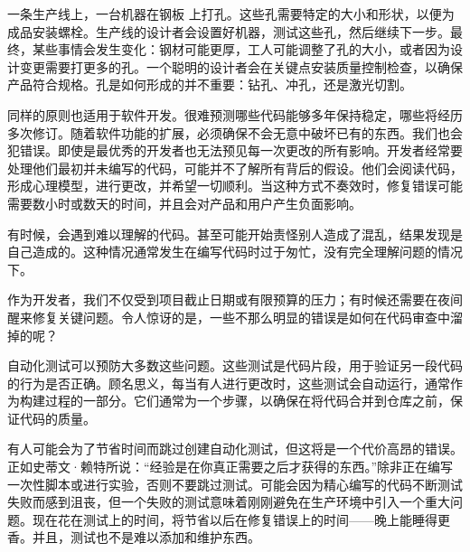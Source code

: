 一条生产线上，一台机器在钢板 上打孔。这些孔需要特定的大小和形状，以便为成品安装螺栓。生产线的设计者会设置好机器，测试这些孔，然后继续下一步。最终，某些事情会发生变化：钢材可能更厚，工人可能调整了孔的大小，或者因为设计变更需要打更多的孔。一个聪明的设计者会在关键点安装质量控制检查，以确保产品符合规格。孔是如何形成的并不重要：钻孔、冲孔，还是激光切割。

同样的原则也适用于软件开发。很难预测哪些代码能够多年保持稳定，哪些将经历多次修订。随着软件功能的扩展，必须确保不会无意中破坏已有的东西。我们也会犯错误。即使是最优秀的开发者也无法预见每一次更改的所有影响。开发者经常要处理他们最初并未编写的代码，可能并不了解所有背后的假设。他们会阅读代码，形成心理模型，进行更改，并希望一切顺利。当这种方式不奏效时，修复错误可能需要数小时或数天的时间，并且会对产品和用户产生负面影响。

有时候，会遇到难以理解的代码。甚至可能开始责怪别人造成了混乱，结果发现是自己造成的。这种情况通常发生在编写代码时过于匆忙，没有完全理解问题的情况下。

作为开发者，我们不仅受到项目截止日期或有限预算的压力；有时候还需要在夜间醒来修复关键问题。令人惊讶的是，一些不那么明显的错误是如何在代码审查中溜掉的呢？

自动化测试可以预防大多数这些问题。这些测试是代码片段，用于验证另一段代码的行为是否正确。顾名思义，每当有人进行更改时，这些测试会自动运行，通常作为构建过程的一部分。它们通常为一个步骤，以确保在将代码合并到仓库之前，保证代码的质量。

有人可能会为了节省时间而跳过创建自动化测试，但这将是一个代价高昂的错误。正如史蒂文·赖特所说：“经验是在你真正需要之后才获得的东西。”除非正在编写一次性脚本或进行实验，否则不要跳过测试。可能会因为精心编写的代码不断测试失败而感到沮丧，但一个失败的测试意味着刚刚避免在生产环境中引入一个重大问题。现在花在测试上的时间，将节省以后在修复错误上的时间——晚上能睡得更香。并且，测试也不是难以添加和维护东西。